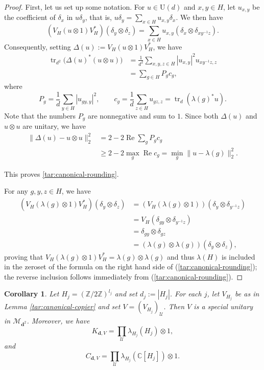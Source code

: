 \documentclass[12pt]{amsart}
\numberwithin{equation}{section}
\newtheorem{cor}[thm]{Corollary}
\theoremstyle{definition}
\newcommand{\C}{\mathbb{C}}
\def\cal{\mathcal}
\def\M{\mathcal{M}}
\DeclareMathOperator{\tr}{tr}
\newcommand\cU{{\cal U}}
\def \M{\mathcal{M}}
\begin{document}
\begin{proof}
First, let us set up some notation.  For $u\in\mathrm U(d)$ and $x,y\in H$, let $u_{x,y}$ be the coefficient of
$\delta_x$ in $u\delta_y$, that is, $u\delta_y=\sum_{x\in H}u_{x,y}\delta_x$.  We then have
\[
 (V_H(u\otimes1)V_H^*)(\delta_y\otimes\delta_z)
 =\sum_{x\in H}u_{x,y}(\delta_x\otimes\delta_{xy^{-1}z}).
\]
Consequently, setting $\Delta(u):=V_H(u\otimes1)V_H^*$, we have
\begin{align*}
 \tr_{d^2}\big(\Delta(u)^*(u\otimes u)\big)
 &=\frac1{d^2}\sum_{x,y,z\in H}
       |u_{x,y}|^2 u_{xy^{-1}z,z}\\
 &=\sum_{g\in H}P_g c_g,
\end{align*}
where
\[
 P_g=\frac1d\sum_{y\in H}|u_{gy,y}|^2,\qquad
 c_g=\frac1d\sum_{z\in H}u_{gz,z}
     =\tr_d(\lambda(g)^*u).
\]
Note that the numbers $P_g$ are nonnegative and sum to $1$.  Since both $\Delta(u)$
and $u\otimes u$ are unitary, we have
\begin{align*}
 \|\Delta(u)-u\otimes u\|_2^2
 &=2-2\operatorname{Re}\sum_gP_gc_g\\
 &\geq2-2\max_g\operatorname{Re}c_g
 =\min_g\|u-\lambda(g)\|_2^2.
\end{align*}

This proves \eqref{tar:canonical-rounding}.

For any $g,y,z\in H$, we have
\begin{align*}
(V_H(\lambda(g)\otimes 1)V_H^*)(\delta_y\otimes \delta_z)&=(V_H(\lambda(g)\otimes 1))(\delta_y\otimes \delta_{y^{-1}z})\\
&=V_H(\delta_{gy}\otimes \delta_{y^{-1}z})\\
&=\delta_{gy}\otimes \delta_{gz}\\
&=(\lambda(g)\otimes \lambda(g))(\delta_y\otimes \delta_z),
\end{align*}
proving that $V_H(\lambda(g)\otimes 1)V_H^*=\lambda(g)\otimes \lambda(g)$ and thus $\lambda(H)$ is included in the zeroset of the formula on the right hand side of (\ref{tar:canonical-rounding}); the reverse inclusion follows immediately from (\ref{tar:canonical-rounding}).
\end{proof}

\begin{cor}
\label{tar:canonical-elementary}
Let $H_j=(\mathbb Z/2\mathbb Z)^{l_j}$ and set $d_j:=|H_j|$.  For each $j$, let $V_{H_j}$ be as in Lemma \ref{tar:canonical-copier} and set $V=(V_{H_j})_\cU$.  Then $V$ is a special unitary in $\M_{\mathbf{d}^2}$.  Moreover, we have
\[
 K_{\mathbf{d},V}=\prod_\cU \lambda_{H_j}(H_j)\otimes 1,
\]
and
\[
 C_{\mathbf{d},V}=
 \prod_\cU\lambda_{H_j}(\C[H_j])\otimes 1.
\]
\end{cor}
\end{document}
